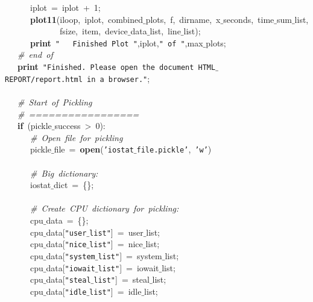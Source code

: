 \mbox{}\ \ \ \ \ \ iplot\ =\ iplot\ +\ 1; \\
\mbox{}\ \ \ \ \ \ \textbf{plot11}(iloop,\ iplot,\ combined$\_$plots,\ f,\ dirname,\ x$\_$seconds,\ time$\_$sum$\_$list, \\
\mbox{}\ \ \ \ \ \ \ \ \ \ \ \ \ fsize,\ item,\ device$\_$data$\_$list,\ line$\_$list); \\
\mbox{}\ \ \ \ \ \ \textbf{print}\ \texttt{"{}\ \ \ Finished\ Plot\ "{}},iplot,\texttt{"{}\ of\ "{}},max$\_$plots; \\
\mbox{}\ \ \ \textit{\#\ end\ of} \\
\mbox{}\ \ \ \textbf{print}\ \texttt{"{}Finished.\ Please\ open\ the\ document\ HTML$\_$REPORT/report.html\ in\ a\ browser."{}}; \\
\mbox{}\ \ \  \\
\mbox{}\ \ \ \textit{\#\ Start\ of\ Pickling} \\
\mbox{}\ \ \ \textit{\#\ =================} \\
\mbox{}\ \ \ \textbf{if}\ (pickle$\_$success\ \textgreater{}\ 0): \\
\mbox{}\ \ \ \ \ \ \textit{\#\ Open\ file\ for\ pickling} \\
\mbox{}\ \ \ \ \ \ pickle$\_$file\ =\ \textbf{open}(\texttt{'iostat$\_$file.pickle'},\ \texttt{'w'}) \\
\mbox{}\ \ \ \ \ \  \\
\mbox{}\ \ \ \ \ \ \textit{\#\ Big\ dictionary:} \\
\mbox{}\ \ \ \ \ \ iostat$\_$dict\ =\ \{\}; \\
\mbox{}\ \ \ \ \ \  \\
\mbox{}\ \ \ \ \ \ \textit{\#\ Create\ CPU\ dictionary\ for\ pickling:} \\
\mbox{}\ \ \ \ \ \ cpu$\_$data\ =\ \{\}; \\
\mbox{}\ \ \ \ \ \ cpu$\_$data[\texttt{"{}user$\_$list"{}}]\ =\ user$\_$list; \\
\mbox{}\ \ \ \ \ \ cpu$\_$data[\texttt{"{}nice$\_$list"{}}]\ =\ nice$\_$list; \\
\mbox{}\ \ \ \ \ \ cpu$\_$data[\texttt{"{}system$\_$list"{}}]\ =\ system$\_$list; \\
\mbox{}\ \ \ \ \ \ cpu$\_$data[\texttt{"{}iowait$\_$list"{}}]\ =\ iowait$\_$list; \\
\mbox{}\ \ \ \ \ \ cpu$\_$data[\texttt{"{}steal$\_$list"{}}]\ =\ steal$\_$list; \\
\mbox{}\ \ \ \ \ \ cpu$\_$data[\texttt{"{}idle$\_$list"{}}]\ =\ idle$\_$list; \\

